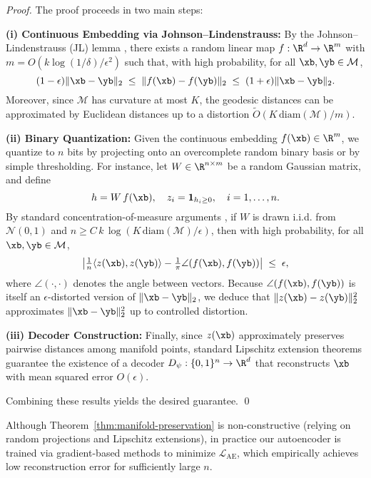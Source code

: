 \documentclass[11pt,letterpaper]{article}
\begin{document}
\begin{proof}
The proof proceeds in two main steps:

\textbf{(i) Continuous Embedding via Johnson--Lindenstrauss:} By the Johnson--Lindenstrauss (JL) lemma \cite{johnson1984extensions}, there exists a random linear map $f: \R^d \to \R^m$ with $m = O(k\log(1/\delta)/\epsilon^2)$ such that, with high probability, for all $\xb,\yb \in \mathcal{M}$,
\[
(1-\epsilon)\|\xb-\yb\|_2 \;\le\; \|f(\xb)-f(\yb)\|_2 \;\le\; (1+\epsilon)\|\xb-\yb\|_2.
\]
Moreover, since $\mathcal{M}$ has curvature at most $K$, the geodesic distances can be approximated by Euclidean distances up to a distortion $\tilde O(K\,\mathrm{diam}(\mathcal{M})/m)$.

\textbf{(ii) Binary Quantization:} Given the continuous embedding $f(\xb) \in \R^m$, we quantize to $n$ bits by projecting onto an overcomplete random binary basis or by simple thresholding. For instance, let $W \in \R^{n\times m}$ be a random Gaussian matrix, and define
\[
h = W\,f(\xb), \quad
z_i = \mathbf{1}_{h_i \ge 0}, \quad i=1,\ldots,n.
\]
By standard concentration-of-measure arguments \cite{diakonikolas2019fourier}, if $W$ is drawn i.i.d. from $\mathcal{N}(0,1)$ and $n \ge C\,k\,\log(K\,\mathrm{diam}(\mathcal{M})/\epsilon)$, then with high probability, for all $\xb,\yb \in \mathcal{M}$,
\[
\bigl\lvert \tfrac{1}{n} \langle z(\xb), z(\yb) \rangle - \tfrac{1}{\pi} \angle(f(\xb),f(\yb)) \bigr\rvert \;\le\; \epsilon,
\]
where $\angle(\cdot,\cdot)$ denotes the angle between vectors. Because $\angle(f(\xb),f(\yb))$ is itself an $\epsilon$-distorted version of $\|\xb-\yb\|_2$, we deduce that $\|z(\xb) - z(\yb)\|_2^2$ approximates $\|\xb-\yb\|_2^2$ up to controlled distortion.

\textbf{(iii) Decoder Construction:} Finally, since $z(\xb)$ approximately preserves pairwise distances among manifold points, standard Lipschitz extension theorems \cite{kirszbraun1934extensions} guarantee the existence of a decoder $D_\psi: \{0,1\}^n \to \R^d$ that reconstructs $\xb$ with mean squared error $O(\epsilon)$.

Combining these results yields the desired guarantee. \qed
\end{proof}

\begin{remark}
Although Theorem~\ref{thm:manifold-preservation} is non-constructive (relying on random projections and Lipschitz extensions), in practice our autoencoder is trained via gradient-based methods to minimize $\mathcal{L}_{\text{AE}}$, which empirically achieves low reconstruction error for sufficiently large $n$.
\end{remark}
\end{document}
